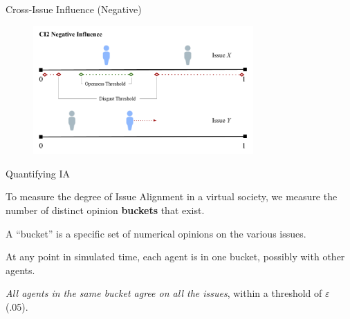 \documentclass[12pt]{beamer}
\begin{document}
\begin{frame}[c]{Cross-Issue Influence (Negative)}  %



\begin{figure}
	\includegraphics[width=0.75\textwidth]{images/CI2Negative.png}
\end{figure}

\end{frame}
\begin{frame}[c]{Quantifying IA} %

To measure the degree of Issue Alignment in a virtual society, we measure the
number of distinct opinion \textbf{buckets} that exist.

\bigskip
\pause
A ``bucket'' is a specific set of numerical opinions on the various issues.

At any point in simulated time, each agent is in one bucket, possibly with
other agents.

\textit{All agents in the same bucket agree on all the issues}, within a
threshold of $\varepsilon$ (.05).

\end{frame}
\end{document}
